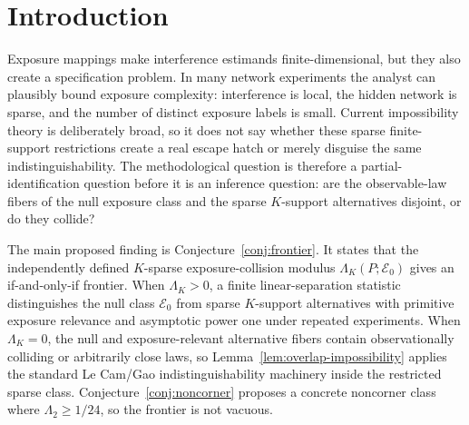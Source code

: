 \documentclass[11pt]{article}
\theoremstyle{definition}
\theoremstyle{plain}
\theoremstyle{remark}
\begin{document}
\begin{abstract}
\citet{GaoHarshawSavjeWang2026} show that exposure-map specification tests have a severe worst-case impossibility: without further restrictions, no test uniformly beats random rejection against larger exposure-map alternatives.  This proposal asks whether the impossibility remains sharp when alternatives are sparse-network-compatible, have exposure image cardinality at most \(K\), and satisfy a primitive exposure-relevance contrast.  The proposed kernel is a finite collision frontier: a named modulus \(\Lambda_K(P;\mathcal E_0)\) is conjectured to be positive exactly when exposure-relevant sparse \(K\)-support alternatives are observationally separated from the null exposure class, and zero exactly when the \citet{LeCam1986}/Gao indistinguishability argument can be carried inside the sparse class.  Conjecture~\ref{conj:frontier} is the flagship statement; it is positioned against the classical total-variation testing frontier of \citet[Chapter~6]{LeCam1986}, the exposure-map impossibility of \citet{GaoHarshawSavjeWang2026}, and informed by \citet{Savje2024}'s definition-vs-assumption distinction and \citet{WeinsteinNevo2026}'s network-equivalence discussion.  If resolved, the result would tell applied network analysts when to test an exposure mapping and, at pointwise collisions, when to abandon testing and report the sharp random-set direct/indirect region instead.
\end{abstract}

\section{Introduction}
Exposure mappings make interference estimands finite-dimensional, but they also create a specification problem.  In many network experiments the analyst can plausibly bound exposure complexity: interference is local, the hidden network is sparse, and the number of distinct exposure labels is small.  Current impossibility theory is deliberately broad, so it does not say whether these sparse finite-support restrictions create a real escape hatch or merely disguise the same indistinguishability.  The methodological question is therefore a partial-identification question before it is an inference question: are the observable-law fibers of the null exposure class and the sparse \(K\)-support alternatives disjoint, or do they collide?

The main proposed finding is Conjecture~\ref{conj:frontier}.  It states that the independently defined \(K\)-sparse exposure-collision modulus \(\Lambda_K(P;\mathcal E_0)\) gives an if-and-only-if frontier.  When \(\Lambda_K>0\), a finite linear-separation statistic distinguishes the null class \(\mathcal E_0\) from sparse \(K\)-support alternatives with primitive exposure relevance and asymptotic power one under repeated experiments.  When \(\Lambda_K=0\), the null and exposure-relevant alternative fibers contain observationally colliding or arbitrarily close laws, so Lemma~\ref{lem:overlap-impossibility} applies the standard Le Cam/Gao indistinguishability machinery inside the restricted sparse class.  Conjecture~\ref{conj:noncorner} proposes a concrete noncorner class where \(\Lambda_2\ge 1/24\), so the frontier is not vacuous.
\end{document}
